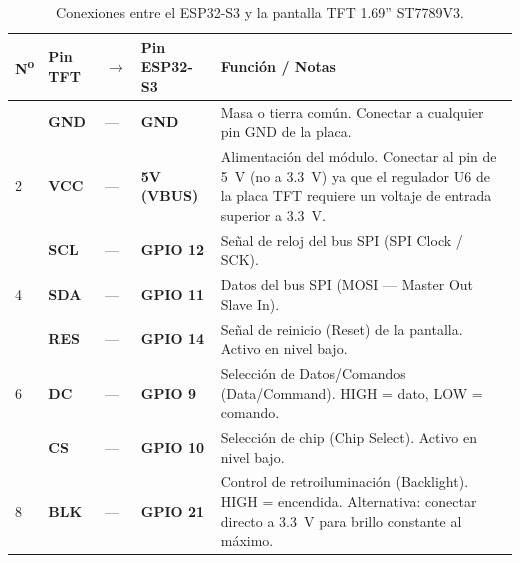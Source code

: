 \documentclass[11pt,a4paper]{article}
\begin{document}
\begin{table}[h!]
\centering
\renewcommand{\arraystretch}{1.4}
\begin{tabular}{
    >{\centering\arraybackslash}m{1.2cm}
    >{\bfseries\centering\arraybackslash}m{1.5cm}
    >{\centering\arraybackslash}m{1cm}
    >{\bfseries\centering\arraybackslash}m{2cm}
    m{5.5cm}
}
\toprule
\rowcolor{azulESP!15}
\textbf{N\textsuperscript{o}} & \textbf{Pin TFT} & \textbf{$\rightarrow$} & \textbf{Pin ESP32-S3} & \textbf{Función / Notas} \\
\midrule

1 & \textcolor{negroGND}{GND} & --- & GND & Masa o tierra común. Conectar a cualquier pin GND de la placa. \\[2pt]

\rowcolor{grisFondo}
2 & \textcolor{rojoVCC}{VCC} & --- & 5V (VBUS) & Alimentación del módulo. Conectar al pin de \SI{5}{\volt} (no a \SI{3.3}{\volt}) ya que el regulador U6 de la placa TFT requiere un voltaje de entrada superior a \SI{3.3}{\volt}. \\[2pt]

3 & SCL & --- & GPIO 12 & Señal de reloj del bus SPI (SPI Clock / SCK). \\[2pt]

\rowcolor{grisFondo}
4 & SDA & --- & GPIO 11 & Datos del bus SPI (MOSI --- Master Out Slave In). \\[2pt]

5 & RES & --- & GPIO 14 & Señal de reinicio (Reset) de la pantalla. Activo en nivel bajo. \\[2pt]

\rowcolor{grisFondo}
6 & DC & --- & GPIO 9 & Selección de Datos/Comandos (Data/Command). HIGH = dato, LOW = comando. \\[2pt]

7 & CS & --- & GPIO 10 & Selección de chip (Chip Select). Activo en nivel bajo. \\[2pt]

\rowcolor{grisFondo}
8 & BLK & --- & GPIO 21 & Control de retroiluminación (Backlight). HIGH = encendida. Alternativa: conectar directo a \SI{3.3}{\volt} para brillo constante al máximo. \\[2pt]

\bottomrule
\end{tabular}
\caption{Conexiones entre el ESP32-S3 y la pantalla TFT 1.69'' ST7789V3.}
\label{tab:conexiones}
\end{table}

\end{document}
